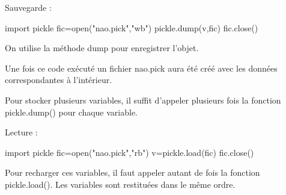 \documentclass[10pt,fleqn]{article} %
\begin{document}
\begin{minipage}[t]{.49\linewidth}

Sauvegarde :


\begin{py}
\begin{python}[h]
import pickle
fic=open("nao.pick","wb")
pickle.dump(v,fic)
fic.close()
\end{python}
\end{py}

On utilise la méthode dump pour enregistrer l'objet.

Une fois ce code exécuté un fichier nao.pick aura été créé avec les données correspondantes à l'intérieur.

Pour stocker plusieurs variables, il suffit d'appeler plusieurs fois la fonction pickle.dump() pour chaque variable.

\end{minipage} \hfill
\begin{minipage}[t]{.49\linewidth}

Lecture :	

\begin{py}
\begin{python}[h]
import pickle
fic=open("nao.pick","rb")
v=pickle.load(fic)
fic.close()
\end{python}
\end{py}



Pour recharger ces variables, il faut appeler autant de fois la fonction pickle.load(). Les variables sont restituées dans le même ordre.

\end{minipage}


\begin{thebibliography}{2}
\end{thebibliography}
\end{document}
